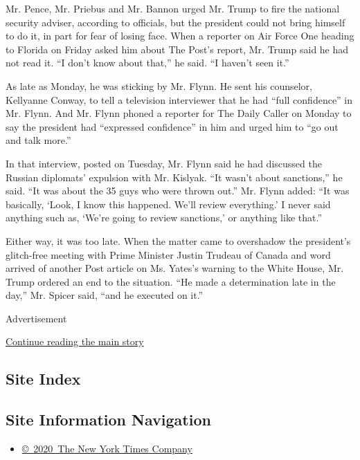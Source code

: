 Mr. Pence, Mr. Priebus and Mr. Bannon urged Mr. Trump to fire the
national security adviser, according to officials, but the president
could not bring himself to do it, in part for fear of losing face. When
a reporter on Air Force One heading to Florida on Friday asked him about
The Post's report, Mr. Trump said he had not read it. ``I don't know
about that,'' he said. ``I haven't seen it.''

As late as Monday, he was sticking by Mr. Flynn. He sent his counselor,
Kellyanne Conway, to tell a television interviewer that he had ``full
confidence'' in Mr. Flynn. And Mr. Flynn phoned a reporter for The Daily
Caller on Monday to say the president had ``expressed confidence'' in
him and urged him to ``go out and talk more.''

In that interview, posted on Tuesday, Mr. Flynn said he had discussed
the Russian diplomats' expulsion with Mr. Kislyak. ``It wasn't about
sanctions,'' he said. ``It was about the 35 guys who were thrown out.''
Mr. Flynn added: ``It was basically, `Look, I know this happened. We'll
review everything.' I never said anything such as, `We're going to
review sanctions,' or anything like that.''

Either way, it was too late. When the matter came to overshadow the
president's glitch-free meeting with Prime Minister Justin Trudeau of
Canada and word arrived of another Post article on Ms. Yates's warning
to the White House, Mr. Trump ordered an end to the situation. ``He made
a determination late in the day,'' Mr. Spicer said, ``and he executed on
it.''

Advertisement

\protect\hyperlink{after-bottom}{Continue reading the main story}

\hypertarget{site-index}{%
\subsection{Site Index}\label{site-index}}

\hypertarget{site-information-navigation}{%
\subsection{Site Information
Navigation}\label{site-information-navigation}}

\begin{itemize}
\tightlist
\item
  \href{https://help.nytimes.com/hc/en-us/articles/115014792127-Copyright-notice}{©~2020~The
  New York Times Company}
\end{itemize}

